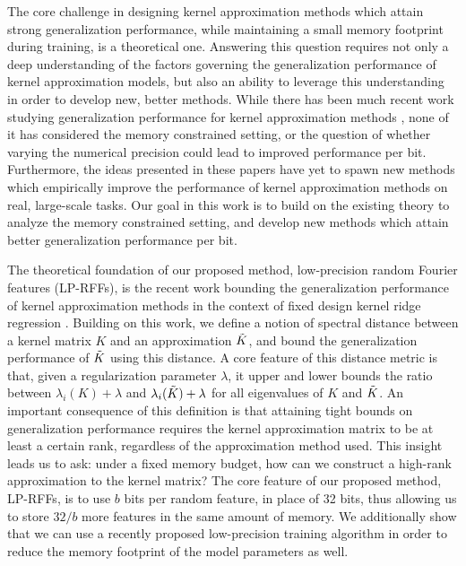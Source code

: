 
The core challenge in designing kernel approximation methods which attain strong generalization performance, while maintaining a small memory footprint during training, is a theoretical one. Answering this question requires not only a deep understanding of the factors governing the generalization performance of kernel approximation models, but also an ability to leverage this understanding in order to develop new, better methods. While there has been much recent work studying generalization performance for kernel approximation methods \citep{rudi17,avron17,musco17,bach17}, none of it has considered the memory constrained setting, or the question of whether varying the numerical precision could lead to improved performance per bit.  Furthermore, the ideas presented in these papers have yet to spawn new methods which empirically improve the performance of kernel approximation methods on real, large-scale tasks. Our goal in this work is to build on the existing theory to analyze the memory constrained setting, and develop new methods which attain better generalization performance per bit. 

The theoretical foundation of our proposed method, low-precision random Fourier features (LP-RFFs), is the recent work bounding the generalization performance of kernel approximation methods in the context of fixed design kernel ridge regression \citep{avron17,musco17}. Building on this work, we define a notion of spectral distance between a kernel matrix $K$ and an approximation $\tilde{K}$, and bound the generalization performance of $\tilde{K}$ using this distance. A core feature of this distance metric is that, given a regularization parameter $\lambda$, it upper and lower bounds the ratio between $\lambda_i(K)+\lambda$ and $\lambda_i(\tilde{K}) + \lambda$ for all eigenvalues of $K$ and $\tilde{K}$. An important consequence of this definition is that attaining tight bounds on generalization performance requires the kernel approximation matrix to be at least a certain rank, regardless of the approximation method used. This insight leads us to ask: under a fixed memory budget, how can we construct a high-rank approximation to the kernel matrix? The core feature of our proposed method, LP-RFFs, is to use $b$ bits per random feature, in place of 32 bits, thus allowing us to store $32/b$ more features in the same amount of memory. We additionally show that we can use a recently proposed low-precision training algorithm \citep{halp18} in order to reduce the memory footprint of the model parameters as well.

